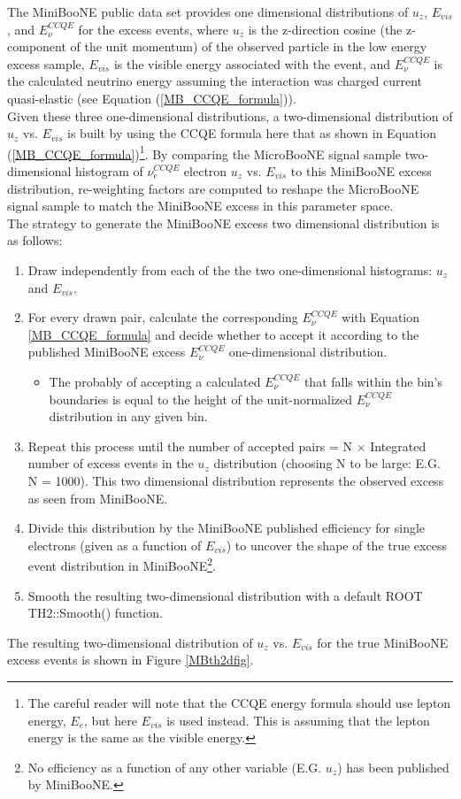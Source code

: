The MiniBooNE public data set \cite{MB_lee_datarelease} provides one dimensional distributions of $u_z$, $E_{vis}$, and $E_\nu^{CCQE}$ for the excess events, where $u_z$ is the z-direction cosine (the z- component of the unit momentum) of the observed particle in the low energy excess sample, $E_{vis}$ is the visible energy associated with the event, and $E_{\nu}^{CCQE}$ is the calculated neutrino energy assuming the interaction was charged current quasi-elastic (see Equation (\ref{MB_CCQE_formula})).\\

Given these three one-dimensional distributions, a two-dimensional distribution of $u_z$ vs. $E_{vis}$ is built by using the CCQE formula here that as shown in Equation (\ref{MB_CCQE_formula})\footnote{The careful reader will note that the CCQE energy formula should use lepton energy, $E_e$, but here $E_{vis}$ is used instead. This is assuming that the lepton energy is the same as the visible energy.}. By comparing the MicroBooNE signal sample two-dimensional histogram of $\nu_e^{CCQE}$ electron $u_z$ vs. $E_{vis}$ to this MiniBooNE excess distribution, re-weighting factors are computed to reshape the MicroBooNE signal sample to match the MiniBooNE excess in this parameter space.\\

The strategy to generate the MiniBooNE excess two dimensional distribution is as follows:
\begin{enumerate}
\item Draw independently from each of the the two one-dimensional histograms: $u_z$ and $E_{vis}$.
\item For every drawn pair, calculate the corresponding $E_\nu^{CCQE}$ with Equation \ref{MB_CCQE_formula} and decide whether to accept it according to the published MiniBooNE excess $E_\nu^{CCQE}$ one-dimensional distribution.
	\begin{itemize}
	\item The probably of accepting a calculated $E_\nu^{CCQE}$ that falls within the bin's boundaries is equal to the height of the unit-normalized $E_\nu^{CCQE}$ distribution in any given bin.
	\end{itemize}
\item Repeat this process until the number of accepted pairs = N $\times$ Integrated number of excess events in the $u_z$ distribution (choosing N to be large: E.G. N = 1000). This two dimensional distribution represents the observed excess as seen from MiniBooNE.
\item Divide this distribution by the MiniBooNE published efficiency for single electrons (given as a function of $E_{vis}$) to uncover the shape of the true excess event distribution in MiniBooNE\footnote{No efficiency as a function of any other variable (E.G. $u_z$) has been published by MiniBooNE.}.
\item Smooth the resulting two-dimensional distribution with a default ROOT TH2::Smooth() function.
\end{enumerate}
The resulting two-dimensional distribution of $u_z$ vs. $E_{vis}$ for the true MiniBooNE excess events is shown in Figure \ref{MBth2dfig}.


